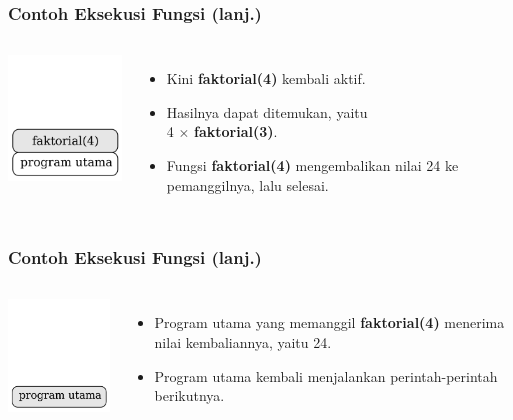 \begin{frame}
\frametitle{Contoh Eksekusi Fungsi (lanj.)}
\begin{columns}
    \centering
    \includegraphics[width=4cm]{asset/rekursi-2.pdf}
    \begin{itemize}
      \item Kini \textbf{faktorial(4)} kembali aktif.
      \item Hasilnya dapat ditemukan, yaitu \\ 4 $\times$ \textbf{faktorial(3)}.
      \item Fungsi \textbf{faktorial(4)} mengembalikan nilai 24 ke pemanggilnya, lalu selesai.
    \end{itemize}
  \end{columns} 
\end{frame}

\begin{frame}
\frametitle{Contoh Eksekusi Fungsi (lanj.)}
\begin{columns}
    \centering
    \includegraphics[width=4cm]{asset/rekursi-1.pdf}
    \begin{itemize}
      \item Program utama yang memanggil \textbf{faktorial(4)} menerima nilai kembaliannya, yaitu 24.
      \item Program utama kembali menjalankan perintah-perintah berikutnya.
    \end{itemize}
  \end{columns} 
\end{frame}

